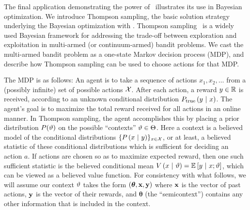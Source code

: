 The final application demonstrating the power of \gpmem\ illustrates its use in Bayesian optimization. We introduce Thompson sampling, the basic solution strategy
underlying the Bayesian optimization with \gpmem.
Thompson sampling~\cite{thompson1933likelihood} is a widely used Bayesian
framework for addressing the trade-off between exploration and exploitation in
multi-armed (or continuum-armed) bandit problems.  
We cast the multi-armed bandit problem as a one-state Markov
decision process (MDP), and describe how Thompson sampling can be used to choose
actions for that MDP.

The MDP is as follows: An agent is to take a sequence of actions $x_1, x_2,
\ldots$ from a (possibly infinite) set of possible actions $\mathcal{X}$.  After each
action, a reward $y \in \mathbb{R}$ is received, according to an unknown conditional
distribution $P_{\textrm{true}}\left( y \ \middle\vert\  x \right)$.  The agent's goal is to maximize the
total reward received for all actions in an online manner.  In Thompson
sampling, the agent accomplishes this by placing a prior distribution
$P(\vartheta)$ on the possible ``contexts'' $\vartheta \in \Theta$.  Here a context
is a believed model of the conditional distributions $\{P\left( x \ \middle\vert\  y \right)\}_{x
\in \mathcal{X}}$, or at least, a believed statistic of these conditional
distributions which is sufficient for deciding an action $a$.  If actions are
chosen so as to maximize expected reward, then one such sufficient statistic is
the believed conditional mean $V \left( x \ \middle\vert\  \vartheta \right) = \mathbb{E}_{}\left[ y \ \middle\vert\ 
x;\vartheta \right]$, which can be viewed as a believed value function.  For
consistency with what follows, we will assume our context $\vartheta$ takes the
form $(\bm{\theta}, \mathbf{x}, \mathbf{y})$ where $\mathbf{x}$ is the vector of past
actions, $\mathbf{y}$ is the vector of their rewards, and $\bm{\theta}$ (the
``semicontext'') contains any other information that is included in the context.

